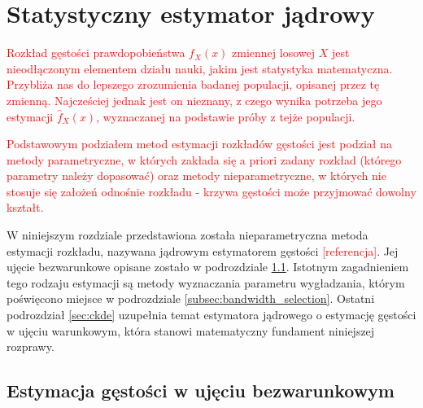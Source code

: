 \documentclass[12pt,a4paper,oneside]{book}
\theoremstyle{definition}
\begin{document}
\chapter{Statystyczny estymator jądrowy} \label{chap:kde}

\textcolor{red}{Rozkład gęstości prawdopobieństwa $f_X(x)$ zmiennej losowej $X$ jest nieodłączonym elementem działu nauki, jakim jest statystyka matematyczna. Przybliża nas do lepszego zrozumienia badanej populacji, opisanej przez tę zmienną. Najcześciej jednak jest on nieznany, z czego wynika potrzeba jego estymacji $\hat{f}_X(x)$, wyznaczanej na podstawie próby z tejże populacji.}

\textcolor{red}{Podstawowym podziałem metod estymacji rozkładów gęstości jest podział na metody parametryczne, w których zakłada się a priori zadany rozkład (którego parametry należy dopasować) oraz metody nieparametryczne, w których nie stosuje się założeń odnośnie rozkładu - krzywa gęstości może przyjmować dowolny kształt.}

W niniejszym rozdziale przedstawiona została nieparametryczna metoda estymacji rozkładu, nazywana jądrowym estymatorem gęstości \textcolor{red}{[referencja]}. Jej ujęcie bezwarunkowe opisane zostało w podrozdziale \ref{sec:kde}. Istotnym zagadnieniem tego rodzaju estymacji są metody wyznaczania parametru wygładzania, którym poświęcono miejsce w podrozdziale \ref{subsec:bandwidth_selection}. Ostatni podrozdział \ref{sec:ckde} uzupełnia temat estymatora jądrowego o estymację gęstości w ujęciu warunkowym, która stanowi matematyczny fundament niniejszej rozprawy.

\section{Estymacja gęstości w ujęciu bezwarunkowym} \label{sec:kde}
\end{document}
